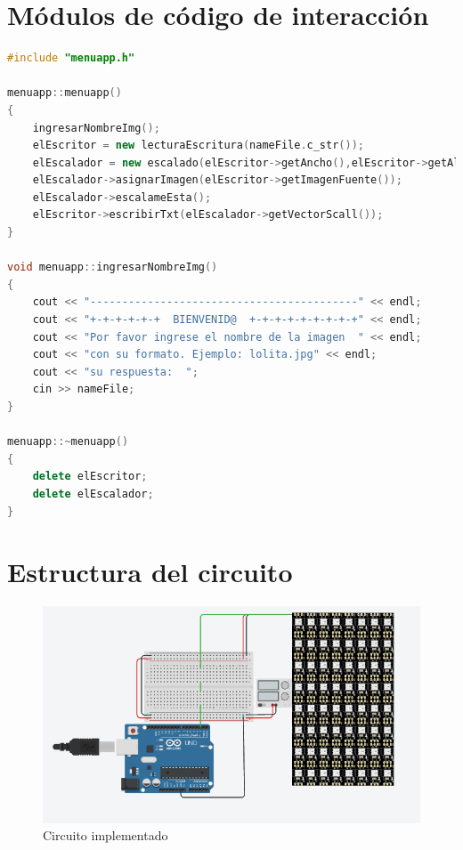 \documentclass{article}
\begin{document}
\section{Módulos de código de interacción}
\begin{lstlisting}[language=C++, caption=Intereacción de clases]
#include "menuapp.h"

menuapp::menuapp()
{
    ingresarNombreImg();
    elEscritor = new lecturaEscritura(nameFile.c_str());
    elEscalador = new escalado(elEscritor->getAncho(),elEscritor->getAlto());
    elEscalador->asignarImagen(elEscritor->getImagenFuente());
    elEscalador->escalameEsta();
    elEscritor->escribirTxt(elEscalador->getVectorScall());
}

void menuapp::ingresarNombreImg()
{
    cout << "------------------------------------------" << endl;
    cout << "+-+-+-+-+-+  BIENVENID@  +-+-+-+-+-+-+-+-+" << endl;
    cout << "Por favor ingrese el nombre de la imagen  " << endl;
    cout << "con su formato. Ejemplo: lolita.jpg" << endl;
    cout << "su respuesta:  ";
    cin >> nameFile;
}

menuapp::~menuapp()
{
    delete elEscritor;
    delete elEscalador;
}

\end{lstlisting}
\newpage
\section{Estructura del circuito}
\begin{figure}[h]
\includegraphics[width=12cm]{resources/circuito.PNG}
\centering
\caption{Circuito implementado}
\end{figure}
\newpage
\end{document}
